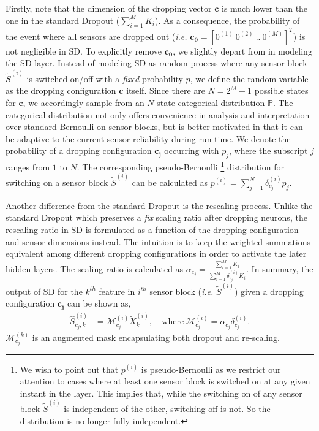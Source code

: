 \documentclass[../thesis.tex]{subfiles}
\begin{document}
Firstly, note that the dimension of the dropping vector $\mathbf{c}$ is much lower than the one in the standard Dropout ($\sum_{i=1}^M K_i$). As a consequence, the probability of the event where all sensors are dropped out (\textit{i.e.} $\mathbf{{c_0}} = [0^{(1)}~0^{(2)}~..~0^{(M)}]^T$) is not negligible in SD. To explicitly remove $\mathbf{{c_0}}$, we slightly depart from \cite{dropout} in modeling the SD layer. Instead of modeling SD as random process where any sensor block $\tilde{S}^{(i)}$ is switched on/off with a \textit{fixed} probability $p$, we define the random variable as the dropping configuration $\mathbf{c}$ itself. Since there are $N = 2^M - 1$ possible states for $\mathbf{c}$, we accordingly sample from an $N$-state categorical distribution $\mathbb{P}$. The categorical distribution not only offers convenience in analysis and interpretation over standard Bernoulli on sensor blocks, but is better-motivated in that it can be adaptive to the current sensor reliability during run-time. We denote the probability of a dropping configuration $\mathbf{{c_j}}$ occurring with $p_j$, where the subscript $j$ ranges from $1$ to $N$. The corresponding pseudo-Bernoulli
\footnote{
We wish to point out that $p^{(i)}$ is pseudo-Bernoulli as we restrict our attention to cases where at least one sensor block is switched on at any given instant in the layer. This implies that, while the switching on of any sensor block $\tilde{S}^{(i)}$ is independent of the other, switching off is not. So the distribution is no longer fully independent.
}
distribution for switching on a sensor block $\tilde{S}^{(i)}$ can be calculated as $p^{(i)} = \sum_{j=1}^N\delta_{c_j}^{(i)} p_j$.
 
 
Another difference from the standard Dropout is the rescaling process. Unlike the standard Dropout which preserves a \textit{fix} scaling ratio after dropping neurons, the rescaling ratio in SD is formulated as a function of the dropping configuration and sensor dimensions instead. The intuition is to keep the weighted summations equivalent among different dropping configurations in order to activate the later hidden layers. The scaling ratio is calculated as $\alpha_{c_j} = \frac{\sum_{i=1}^M K_i }{\sum_{i=1}^M \delta_{c_j}^{(i)} K_i}.$ In summary, the output of SD for the $k^{th}$ feature in $i^{th}$ sensor block (\textit{i.e.} $\tilde{S}^{(i)}$) given a dropping configuration $\mathbf{c_j}$ can be shown as,
\begin{align}
\hat{S}^{(i)}_{{c_j},k} &= \mathcal{M}^{(i)}_{c_j} \tilde{X}_k^{(i)}, \
&\text{where} \ \mathcal{M}^{(i)}_{c_j} = \alpha_{c_j} \delta_{c_j}^{(i)}.
\end{align}
$\mathcal{M}^{(k)}_{c_j}$ is an augmented mask encapsulating both dropout and re-scaling.
 
\end{document}
